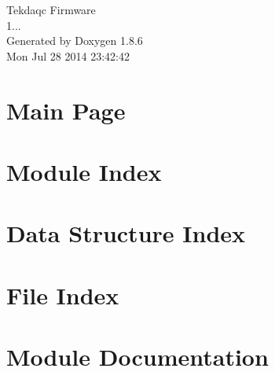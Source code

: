 \documentclass[twoside]{book}
\newcommand{\clearemptydoublepage}{%
  \newpage{\pagestyle{empty}\cleardoublepage}%
}
\begin{document}
\hypersetup{pageanchor=false}
\begin{titlepage}
\vspace*{7cm}
\begin{center}%
{\Large Tekdaqc Firmware \\[1ex]\large 1... }\\
\vspace*{1cm}
{\large Generated by Doxygen 1.8.6}\\
\vspace*{0.5cm}
{\small Mon Jul 28 2014 23:42:42}\\
\end{center}
\end{titlepage}
\clearemptydoublepage
\tableofcontents
\clearemptydoublepage
{}
\hypersetup{pageanchor=true}

\chapter{Main Page}
\label{index}\hypertarget{index}{}
\chapter{Module Index}

\chapter{Data Structure Index}

\chapter{File Index}

\chapter{Module Documentation}





































\end{document}
